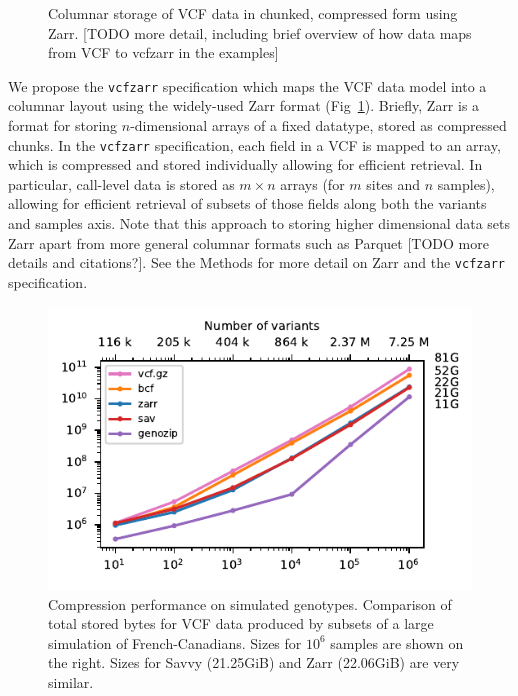 \documentclass[a4paper,num-refs]{oup-contemporary}
\begin{document}
\begin{figure}
\resizebox{225pt}{!}{}
\caption{Columnar storage of VCF data in chunked, compressed form using Zarr.
[TODO more detail, including brief overview of how data maps from 
VCF to vcfzarr in the examples]
\label{fig-data-model}}
\end{figure}

We propose the \texttt{vcfzarr} specification which maps the 
VCF data model into a columnar layout using the
widely-used Zarr format (Fig~\ref{fig-data-model}). 
Briefly, Zarr is a format 
for storing $n$-dimensional arrays of a fixed datatype, stored as 
compressed chunks. In the \texttt{vcfzarr} specification, 
each field in a VCF is mapped to an array, which is compressed 
and stored individually allowing for efficient retrieval. 
In particular, call-level data is stored as $m \times n$ arrays
(for $m$ sites and $n$ samples), allowing for efficient 
retrieval of subsets of those fields along both the 
variants and samples axis.
Note that this approach to storing higher dimensional data
sets Zarr apart from more general columnar formats 
such as Parquet [TODO more details and citations?].
See the Methods for more detail on Zarr and the \texttt{vcfzarr}
specification.

\begin{figure}
\begin{center}
\includegraphics[]{figures/data-scaling}
\end{center}
\caption{Compression performance on simulated genotypes.
Comparison of total stored bytes for VCF data produced 
by subsets of a large simulation of French-Canadians.
Sizes for $10^6$ samples are shown on the right. Sizes 
for Savvy (21.25GiB) and Zarr (22.06GiB) are very similar.
\label{fig-data-storage}}
\end{figure}
\end{document}
